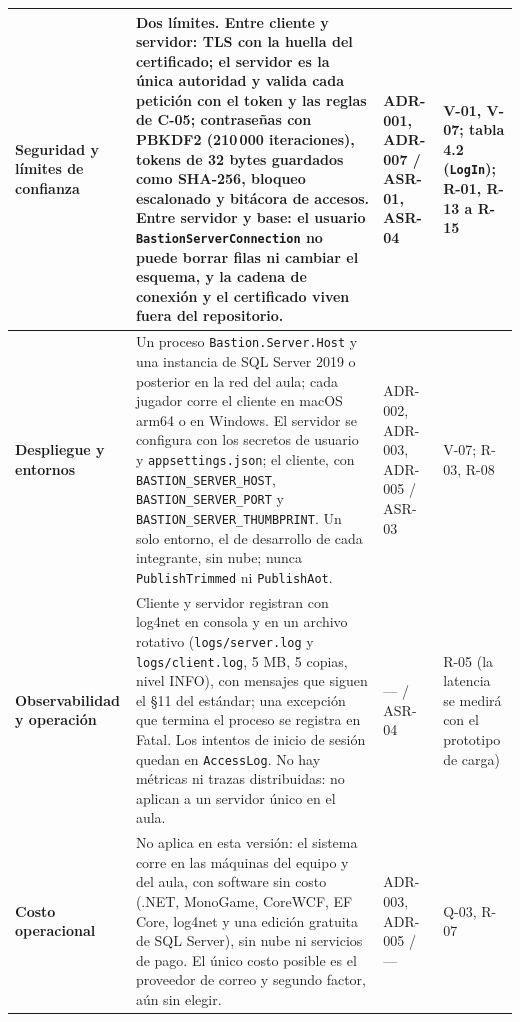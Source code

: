 \documentclass[11pt,letterpaper]{article}
\begin{document}
\begin{xltabular}{\linewidth}{|>{\raggedright\arraybackslash}p{3.4cm}|Y|>{\small\raggedright\arraybackslash}p{2.4cm}|>{\small\raggedright\arraybackslash}p{2.6cm}|}
  \small\bfseries Seguridad y límites de confianza & Dos límites. Entre cliente y servidor: TLS con la huella del certificado; el servidor es la única autoridad y valida cada petición con el token y las reglas de C-05; contraseñas con PBKDF2 (210\,000 iteraciones), tokens de 32 bytes guardados como SHA-256, bloqueo escalonado y bitácora de accesos. Entre servidor y base: el usuario \texttt{BastionServer\allowbreak Connection} no puede borrar filas ni cambiar el esquema, y la cadena de conexión y el certificado viven fuera del repositorio. & ADR-001, ADR-007 / ASR-01, ASR-04 & V-01, V-07; tabla 4.2 (\texttt{LogIn}); R-01, R-13 a R-15\\\hline
  \small\bfseries Despliegue y entornos & Un proceso \texttt{Bastion.Server.Host} y una instancia de SQL Server 2019 o posterior en la red del aula; cada jugador corre el cliente en macOS arm64 o en Windows. El servidor se configura con los secretos de usuario y \texttt{appsettings.json}; el cliente, con \texttt{BASTION\_\allowbreak SERVER\_\allowbreak HOST}, \texttt{BASTION\_\allowbreak SERVER\_\allowbreak PORT} y \texttt{BASTION\_\allowbreak SERVER\_\allowbreak THUMBPRINT}. Un solo entorno, el de desarrollo de cada integrante, sin nube; nunca \texttt{PublishTrimmed} ni \texttt{PublishAot}. & ADR-002, ADR-003, ADR-005 / ASR-03 & V-07; R-03, R-08\\\hline
  \small\bfseries Observabilidad y operación & Cliente y servidor registran con log4net en consola y en un archivo rotativo (\texttt{logs/\allowbreak server.log} y \texttt{logs/\allowbreak client.log}, 5 MB, 5 copias, nivel INFO), con mensajes que siguen el §11 del estándar; una excepción que termina el proceso se registra en Fatal. Los intentos de inicio de sesión quedan en \texttt{AccessLog}. No hay métricas ni trazas distribuidas: no aplican a un servidor único en el aula. & — / ASR-04 & R-05 (la latencia se medirá con el prototipo de carga)\\\hline
  \small\bfseries Costo operacional & No aplica en esta versión: el sistema corre en las máquinas del equipo y del aula, con software sin costo (.NET, MonoGame, CoreWCF, EF Core, log4net y una edición gratuita de SQL Server), sin nube ni servicios de pago. El único costo posible es el proveedor de correo y segundo factor, aún sin elegir. & ADR-003, ADR-005 / — & Q-03, R-07\\\hline
\end{xltabular}

\end{document}
